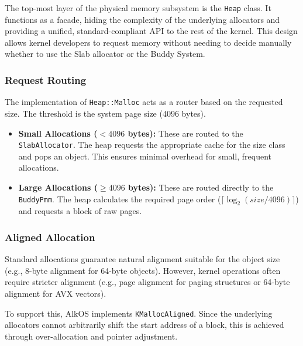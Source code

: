 \documentclass[a4paper,10pt,twoside]{report}
\theoremstyle{definition}
\begin{document}
The top-most layer of the physical memory subsystem is the \texttt{Heap} class. It functions as a facade, hiding the complexity of the underlying allocators and providing a unified, standard-compliant API to the rest of the kernel. This design allows kernel developers to request memory without needing to decide manually whether to use the Slab allocator or the Buddy System.

\subsubsection{Request Routing}

The implementation of \texttt{Heap::Malloc} acts as a router based on the requested size. The threshold is the system page size (4096 bytes).

\begin{itemize}
    \item \textbf{Small Allocations ($< 4096$ bytes):} These are routed to the \texttt{SlabAllocator}. The heap requests the appropriate cache for the size class and pops an object. This ensures minimal overhead for small, frequent allocations.
    \item \textbf{Large Allocations ($\ge 4096$ bytes):} These are routed directly to the \texttt{BuddyPmm}. The heap calculates the required page order ($\lceil \log_2(size / 4096) \rceil$) and requests a block of raw pages.
\end{itemize}

\subsubsection{Aligned Allocation}

Standard allocations guarantee natural alignment suitable for the object size (e.g., 8-byte alignment for 64-byte objects). However, kernel operations often require stricter alignment (e.g., page alignment for paging structures or 64-byte alignment for AVX vectors).

To support this, AlkOS implements \texttt{KMallocAligned}. Since the underlying allocators cannot arbitrarily shift the start address of a block, this is achieved through over-allocation and pointer adjustment.

\clearpage
\end{document}
